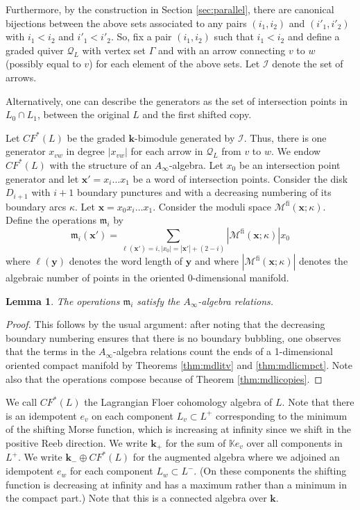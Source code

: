 \documentclass{gtpart}
\newtheorem{lem}[thm]{Lemma}
\renewcommand{\k}{\mathbf{k}}
\newcommand{\m}{\mathfrak{m}}
\newcommand{\fl}{\mathrm{fi}}
\begin{document}
Furthermore, by the construction in Section \ref{sec:parallel}, there are canonical bijections between the above sets associated
to any pairs $(i_1, i_2)$ and $(i'_1, i'_2)$ with $i_1 < i_2$ and $i'_1 < i'_2$. So, fix a pair $(i_1,i_2)$ such that $i_1 < i_2$
and define a graded quiver $\mathcal{Q}_L$ with vertex set $\Gamma$ and with an arrow connecting $v$
to $w$ (possibly equal to $v$) for each element of the above sets. Let $\mathcal{I}$ denote
the set of arrows. 

Alternatively, one can describe the generators as the set of intersection points in $L_{0}\cap L_{1}$, between the original $L$ and the first shifted copy.

Let $CF^*(L)$ be the graded $\k$-bimodule generated by $\mathcal{I}$. Thus, there is one generator $x_{vw}$ in degree $|x_{vw}|$ for each arrow in $\mathcal{Q}_L$ from $v$ to $w$.  We endow $CF^{\ast}(L)$ with the structure of an $A_{\infty}$-algebra. Let $x_{0}$ be an intersection point generator and let $\mathbf{x}'=x_{i}\dots x_{1}$ be a word of intersection points. Consider the disk $D_{i+1}$ with $i+1$ boundary punctures and with a decreasing numbering of its boundary arcs $\kappa$. Let $\mathbf{x}=x_{0}x_{i}\dots x_{1}$.  Consider the moduli space $\mathcal{M}^{\fl}(\mathbf{x};\kappa)$.  Define the operations $\m_{i}$ by
\[ 
\m_{i}(\mathbf{x}') = \sum_{\ell(\mathbf{x}')=i, |x_{0}|=|\mathbf{x}'|+(2-i)} |\mathcal{M}^{\fl}(\mathbf{x};\kappa)|x_{0}
\] 
where $\ell(\mathbf{y})$ denotes the word length of $\mathbf{y}$ and where $|\mathcal{M}^{\fl}(\mathbf{x};\kappa)|$ denotes the algebraic number of points in the oriented 0-dimensional manifold.

\begin{lem}
The operations $\m_{i}$ satisfy the $A_{\infty}$-algebra relations. 
\end{lem}

\begin{proof}
This follows by the usual argument: after noting that the decreasing boundary numbering ensures that there is no boundary bubbling, one observes that the terms in the $A_{\infty}$-algebra relations count the ends of a 1-dimensional oriented compact manifold by Theorems \ref{thm:mdlitv} and \ref{thm:mdlicmpct}. Note also that the operations compose because of Theorem \ref{thm:mdlicopies}.
\end{proof}

We call $CF^{\ast}(L)$ the Lagrangian Floer cohomology algebra of $L$. Note that there is an
idempotent $e_{v}$ on each component $L_{v}\subset L^{+}$ corresponding to the  minimum of the
shifting Morse function, which is increasing at infinity since we shift in the positive Reeb
direction. We write $\k_{+}$ for the sum of $\mathbb{K}e_{v}$ over all components in $L^{+}$. We
write $\k_{-} \oplus CF^*(L)$ for the augmented algebra where we adjoined an idempotent $e_{w}$
for each component $L_w\subset L^{-}$. (On these components the shifting function is decreasing at
infinity and has a maximum rather than a minimum in the compact part.) Note that this is a connected
algebra over $\k$. 
\end{document}
